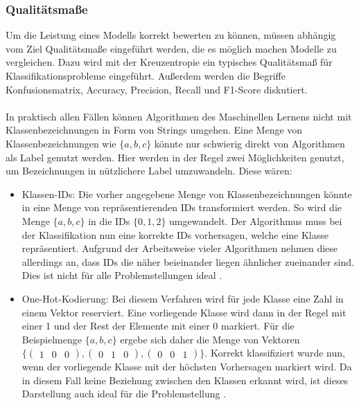 \documentclass[11pt,bibliography=totocnumbered]{scrartcl}
\begin{document}
\subsubsection{Qualitätsmaße}
Um die Leistung eines Modells korrekt bewerten zu können, müssen abhängig vom Ziel Qualitätsmaße eingeführt werden, die es möglich machen Modelle zu vergleichen. Dazu wird mit der Kreuzentropie ein typisches Qualitätsmaß für Klassifikationsprobleme eingeführt. Außerdem werden die Begriffe Konfusionsmatrix, Accuracy, Precision, Recall und F1-Score diskutiert.
\\\\
In praktisch allen Fällen können Algorithmen des Maschinellen Lernens nicht mit Klassenbezeichnungen in Form von Strings umgehen. Eine Menge von Klassenbezeichnungen wie \ensuremath{\{a, b, c \}} könnte nur schwierig direkt von Algorithmen als Label genutzt werden. Hier werden in der Regel zwei Möglichkeiten genutzt, um Bezeichnungen in nützlichere Label umzuwandeln. Diese wären:
\begin{itemize}
	\item Klassen-IDs: Die vorher angegebene Menge von Klassenbezeichnungen könnte in eine Menge von repräsentierenden IDs transformiert werden. So wird die Menge \ensuremath{\{a, b, c \}} in die IDs \ensuremath{\{0, 1, 2 \}} umgewandelt. Der Algorithmus muss bei der Klassifikation nun eine korrekte IDs vorhersagen, welche eine Klasse repräsentiert. Aufgrund der Arbeitsweise vieler Algorithmen nehmen diese allerdings an, dass IDs die näher beieinander liegen ähnlicher zueinander sind. Dies ist nicht für alle Problemstellungen ideal \cite[S.12]{BA}\cite[S.63]{MACHINE_LEARNING}.
	\item One-Hot-Kodierung: Bei diesem Verfahren wird für jede Klasse eine Zahl in einem Vektor reserviert. Eine vorliegende Klasse wird dann in der Regel mit einer 1 und der Rest der Elemente mit einer 0 markiert. Für die Beispielmenge \ensuremath{\{a, b, c \}} ergebe sich daher die Menge von Vektoren \ensuremath{\{\left(\begin{smallmatrix}1 & 0 & 0\end{smallmatrix}\right), \left(\begin{smallmatrix}0 & 1 & 0\end{smallmatrix}\right), \left(\begin{smallmatrix}0 & 0 & 1\end{smallmatrix}\right)\}}. Korrekt klassifiziert wurde nun, wenn der vorliegende Klasse mit der höchsten Vorhersagen markiert wird. Da in diesem Fall keine Beziehung zwischen den Klassen erkannt wird, ist dieses Darstellung auch ideal für die Problemstellung \cite[S.12]{BA}\cite[S.63]{MACHINE_LEARNING}.
\end{itemize}
\end{document}
